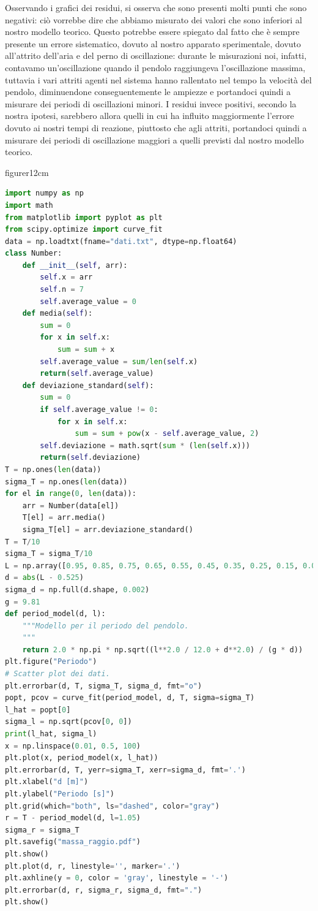\documentclass{article}
\begin{document}
\par\noindent\smallskip Osservando i grafici dei residui, si osserva che sono presenti molti punti che sono negativi: ciò vorrebbe dire che abbiamo misurato dei valori che sono inferiori al nostro modello teorico. Questo potrebbe essere spiegato dal fatto che è sempre presente un errore sistematico, dovuto al nostro apparato sperimentale, dovuto all'attrito dell'aria e del perno di oscillazione: durante le misurazioni noi, infatti, contavamo un'oscillazione quando il pendolo raggiungeva l'oscillazione massima, tuttavia i vari attriti agenti nel sistema hanno rallentato nel tempo la velocità del pendolo, diminuendone conseguentemente le ampiezze e portandoci quindi a misurare dei periodi di oscillazioni minori. I residui invece positivi, secondo la nostra ipotesi, sarebbero allora quelli in cui ha influito maggiormente l'errore dovuto ai nostri tempi di reazione, piuttosto che agli attriti, portandoci quindi a misurare dei periodi di oscillazione maggiori a quelli previsti dal nostro modello teorico.
\newpage

\begin{wrapfloat}{figure}{r}{12cm}
	\begin{lstlisting}[language=Python]
import numpy as np
import math
from matplotlib import pyplot as plt 
from scipy.optimize import curve_fit
data = np.loadtxt(fname="dati.txt", dtype=np.float64)
class Number:
    def __init__(self, arr):
        self.x = arr
        self.n = 7
        self.average_value = 0
    def media(self):
        sum = 0
        for x in self.x:
            sum = sum + x
        self.average_value = sum/len(self.x)
        return(self.average_value)
    def deviazione_standard(self):
        sum = 0
        if self.average_value != 0:
            for x in self.x:
                sum = sum + pow(x - self.average_value, 2)
        self.deviazione = math.sqrt(sum * (len(self.x)))
        return(self.deviazione)
T = np.ones(len(data))
sigma_T = np.ones(len(data))
for el in range(0, len(data)):
    arr = Number(data[el])
    T[el] = arr.media()
    sigma_T[el] = arr.deviazione_standard()
T = T/10
sigma_T = sigma_T/10
L = np.array([0.95, 0.85, 0.75, 0.65, 0.55, 0.45, 0.35, 0.25, 0.15, 0.05])
d = abs(L - 0.525)
sigma_d = np.full(d.shape, 0.002) 
g = 9.81 
def period_model(d, l): 
    """Modello per il periodo del pendolo. 
    """ 
    return 2.0 * np.pi * np.sqrt((l**2.0 / 12.0 + d**2.0) / (g * d)) 
plt.figure("Periodo")
# Scatter plot dei dati. 
plt.errorbar(d, T, sigma_T, sigma_d, fmt="o")  
popt, pcov = curve_fit(period_model, d, T, sigma=sigma_T) 
l_hat = popt[0] 
sigma_l = np.sqrt(pcov[0, 0]) 
print(l_hat, sigma_l) 
x = np.linspace(0.01, 0.5, 100) 
plt.plot(x, period_model(x, l_hat))
plt.errorbar(d, T, yerr=sigma_T, xerr=sigma_d, fmt='.') 
plt.xlabel("d [m]") 
plt.ylabel("Periodo [s]")
plt.grid(which="both", ls="dashed", color="gray")
r = T - period_model(d, l=1.05)
sigma_r = sigma_T
plt.savefig("massa_raggio.pdf") 
plt.show()
plt.plot(d, r, linestyle='', marker='.')
plt.axhline(y = 0, color = 'gray', linestyle = '-') 
plt.errorbar(d, r, sigma_r, sigma_d, fmt=".")
plt.show()
	\end{lstlisting}
\end{wrapfloat}
\end{document}

